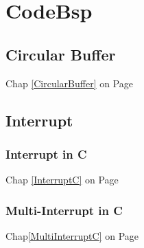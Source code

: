 \section{CodeBsp}
\subsection{Circular Buffer}
Chap \ref{CircularBuffer} on Page \pageref{CircularBuffer}

\clearpage

\subsection{Interrupt}
\subsubsection{Interrupt in C}
Chap \ref{InterruptC} on Page \pageref{InterruptC}


\subsubsection{Multi-Interrupt in C }
Chap\ref{MultiInterruptC} on Page \pageref{MultiInterruptC}


